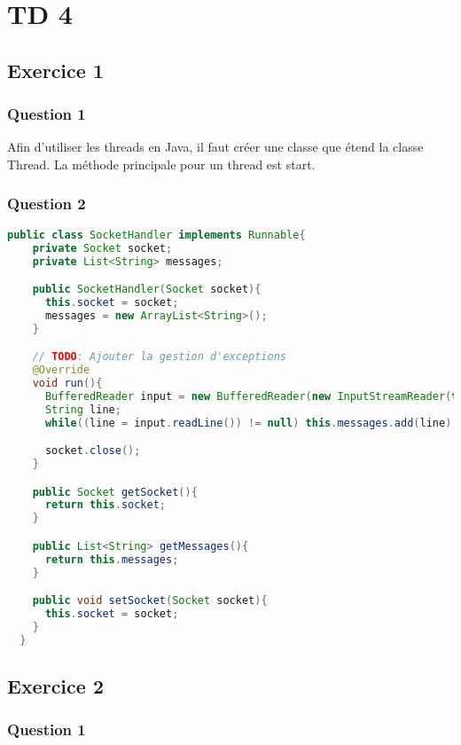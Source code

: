 \section{TD 4}

\subsection{Exercice 1}

\subsubsection{Question 1}

Afin d'utiliser les threads en Java, il faut créer une classe que étend la classe Thread.
La méthode principale pour un thread est start.

\subsubsection{Question 2}

\begin{lstlisting}[language=Java,caption={code de la classe SocketHandler},captionpos=b]
  public class SocketHandler implements Runnable{
    private Socket socket;
    private List<String> messages;

    public SocketHandler(Socket socket){
      this.socket = socket;
      messages = new ArrayList<String>();
    }

    // TODO: Ajouter la gestion d'exceptions
    @Override
    void run(){
      BufferedReader input = new BufferedReader(new InputStreamReader(this.socket.getInputStream());
      String line;
      while((line = input.readLine()) != null) this.messages.add(line);

      socket.close();
    }

    public Socket getSocket(){
      return this.socket;
    }

    public List<String> getMessages(){
      return this.messages;
    }

    public void setSocket(Socket socket){
      this.socket = socket;
    }
  }
\end{lstlisting}

\subsection{Exercice 2}

\subsubsection{Question 1}

